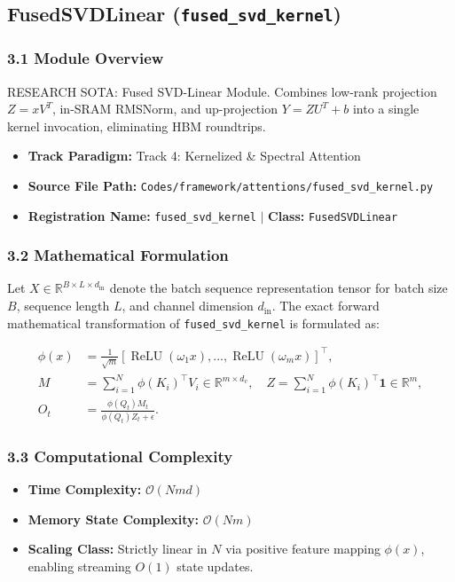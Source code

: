 \subsection{FusedSVDLinear (\texttt{fused\_svd\_kernel})}
\label{sec:app_module_fused_svd_kernel}

\subsubsection*{3.1 Module Overview}
RESEARCH SOTA: Fused SVD-Linear Module. Combines low-rank projection $Z = x V^T$, in-SRAM RMSNorm, and up-projection $Y = Z U^T + b$ into a single kernel invocation, eliminating HBM roundtrips.
\begin{itemize}
    \item \textbf{Track Paradigm:} Track 4: Kernelized \& Spectral Attention
    \item \textbf{Source File Path:} \texttt{Codes/framework/attentions/fused\_svd\_kernel.py}
    \item \textbf{Registration Name:} \texttt{fused\_svd\_kernel} $\mid$ \textbf{Class:} \texttt{FusedSVDLinear}
\end{itemize}

\subsubsection*{3.2 Mathematical Formulation}
Let $X \in \mathbb{R}^{B \times L \times d_{\text{in}}}$ denote the batch sequence representation tensor for batch size $B$, sequence length $L$, and channel dimension $d_{\text{in}}$. The exact forward mathematical transformation of \texttt{fused\_svd\_kernel} is formulated as:

\begin{align}
\phi(x) &= \frac{1}{\sqrt{m}} \left[ \operatorname{ReLU}(\omega_1 x), \dots, \operatorname{ReLU}(\omega_m x) \right]^\top, \\
M &= \sum_{i=1}^N \phi(K_i)^\top V_i \in \mathbb{R}^{m \times d_v}, \quad Z = \sum_{i=1}^N \phi(K_i)^\top \mathbf{1} \in \mathbb{R}^m, \\
O_t &= \frac{\phi(Q_t) M_t}{\phi(Q_t) Z_t + \epsilon}.
\end{align}


\subsubsection*{3.3 Computational Complexity}
\begin{itemize}
    \item \textbf{Time Complexity:} $\mathcal{O}(N m d)$
    \item \textbf{Memory State Complexity:} $\mathcal{O}(N m)$
    \item \textbf{Scaling Class:} Strictly linear in $N$ via positive feature mapping $\phi(x)$, enabling streaming $O(1)$ state updates.
\end{itemize}

